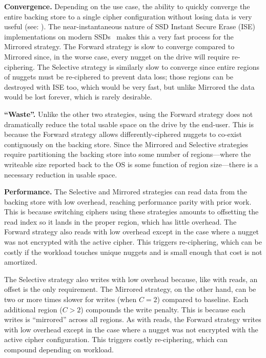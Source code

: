 \textbf{Convergence.} Depending on the use case, the ability to quickly converge
the entire backing store to a single cipher configuration without losing data is
very useful (see: ). The near-instantaneous nature of SSD
Instant Secure Erase (ISE) implementations on modern SSDs~\cite{ISE1,ISE2,ISE3}
makes this a very fast process for the Mirrored strategy. The Forward strategy
is slow to converge compared to Mirrored since, in the worse case, every nugget
on the drive will require re-ciphering. The Selective strategy is similarly slow
to converge since entire regions of nuggets must be re-ciphered to prevent data
loss; those regions can be destroyed with ISE too, which would be very fast, but
unlike Mirrored the data would be lost forever, which is rarely desirable.

\textbf{``Waste''.} Unlike the other two strategies, using the Forward strategy
does not dramatically reduce the total usable space on the drive by the
end-user. This is because the Forward strategy allows differently-ciphered
nuggets to co-exist contiguously on the backing store. Since the Mirrored and
Selective strategies require partitioning the backing store into some number of
regions---where the writeable size reported back to the OS is some function of
region size---there is a necessary reduction in usable space.

\textbf{Performance.} The Selective and Mirrored strategies can read data from
the backing store with low overhead, reaching performance parity with prior
work. This is because switching ciphers using these strategies amounts to
offsetting the read index so it lands in the proper region, which has little
overhead. The Forward strategy also reads with low overhead except in the case
where a nugget was not encrypted with the active cipher. This triggers
re-ciphering, which can be costly if the workload touches unique nuggets and is
small enough that cost is not amortized.

The Selective strategy also writes with low overhead because, like with reads,
an offset is the only requirement. The Mirrored strategy, on the other hand, can
be two or more times slower for writes (when $C = 2$) compared to baseline. Each
additional region ($C > 2$) compounds the write penalty. This is because each
writes is ``mirrored'' across all regions. As with reads, the Forward strategy
writes with low overhead except in the case where a nugget was not
encrypted with the active cipher configuration. This triggers costly
re-ciphering, which can compound depending on workload.\\

